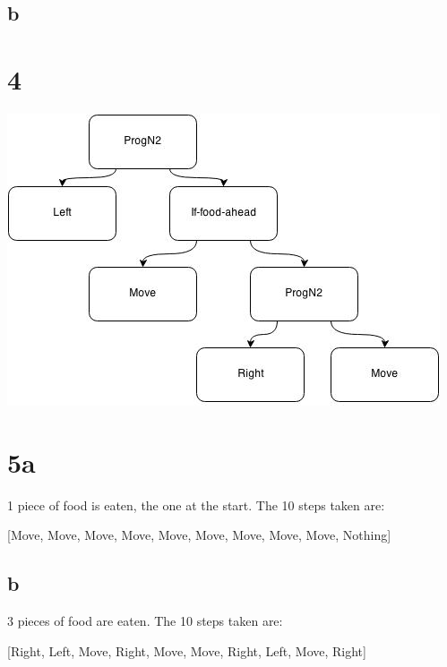 \documentclass[12pt]{article}
\begin{document}
\subsection{b}

\section{4}
\includegraphics{problem4}

\section{5a}
1 piece of food is eaten, the one at the start.  The 10 steps taken are:
\begin{center}
[Move, Move, Move, Move, Move, Move, Move, Move, Move, Nothing]
\end{center}

\subsection{b}
3 pieces of food are eaten.  The 10 steps taken are:
\begin{center}
[Right, Left, Move, Right, Move, Move, Right, Left, Move, Right]
\end{center}
\end{document}
